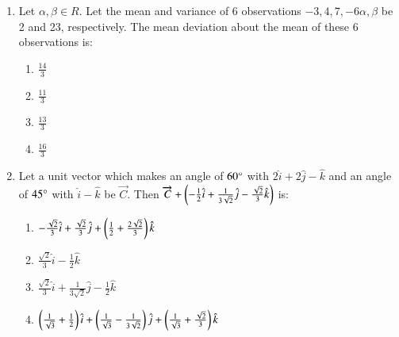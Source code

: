 \documentclass[journal]{IEEEtran}
\begin{document}
\begin{enumerate}
        \begin{multicols}{4}
            \begin{enumerate}
                \item $16$
                \item $1$
                \item $49$
                \item $36$
            \end{enumerate}
        \end{multicols}
        
    \item Let $\alpha,\beta\in R$. Let the mean and variance of 6 observations $-3,4,7,-6\alpha,\beta$ be 2 and 23, respectively. The mean deviation about the mean of these 6 observations is:

        \begin{multicols}{4}
            \begin{enumerate}
                \item $\frac{14}{3}$
                \item $\frac{11}{3}$
                \item $\frac{13}{3}$
                \item $\frac{16}{3}$
            \end{enumerate}
        \end{multicols}

    \item Let a unit vector which makes an angle of $60\degree$ with $2\hat{i}+2\hat{j}-\hat{k}$ and an angle of $45\degree$ with $\hat{i}-\hat{k}$ be $\overrightarrow{C}$. Then $\overrightarrow{C}+\left(-\frac{1}{2}\hat{i}+\frac{1}{3\sqrt{2}}\hat{j}-\frac{\sqrt{2}}{3}\hat{k}\right)$ is:

        \begin{multicols}{2}
            \begin{enumerate}
                \item $-\frac{\sqrt{2}}{3}\hat{i}+\frac{\sqrt{2}}{3}\hat{j}+\left(\frac{1}{2}+\frac{2\sqrt{2}}{3}\right)\hat{k}$
                \item $\frac{\sqrt{2}}{3}\hat{i}-\frac{1}{2}\hat{k}$
                \item $\frac{\sqrt{2}}{3}\hat{i}+\frac{1}{3\sqrt{2}}\hat{j}-\frac{1}{2}\hat{k}$
                \item $\left(\frac{1}{\sqrt{3}}+\frac{1}{2}\right)\hat{i}+\left(\frac{1}{\sqrt{3}}-\frac{1}{3\sqrt{2}}\right)\hat{j}+\left(\frac{1}{\sqrt{3}}+\frac{\sqrt{2}}{3}\right)\hat{k}$ 
            \end{enumerate}
        \end{multicols}
        

\end{enumerate}
\end{document}
